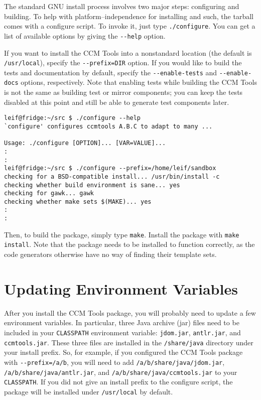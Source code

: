 The standard GNU install process involves two major steps: configuring and
building. To help with platform--independence for installing and such, the
tarball comes with a configure script. To invoke it, just type
\verb+./configure+. You can get a list of available options by giving the
\verb+--help+ option.

If you want to install the CCM Tools into a nonstandard location (the default is
\verb+/usr/local+), specify the \verb+--prefix=DIR+ option. If you would like to
build the tests and documentation by default, specify the \verb+--enable-tests+
and \verb+--enable-docs+ options, respectively. Note that enabling tests while
building the CCM Tools is not the same as building test or mirror components;
you can keep the tests disabled at this point and still be able to generate test
components later.

\begin{verbatim}
leif@fridge:~/src $ ./configure --help
`configure' configures ccmtools A.B.C to adapt to many ...

Usage: ./configure [OPTION]... [VAR=VALUE]...
:
:
leif@fridge:~/src $ ./configure --prefix=/home/leif/sandbox
checking for a BSD-compatible install... /usr/bin/install -c
checking whether build environment is sane... yes
checking for gawk... gawk
checking whether make sets $(MAKE)... yes
:
:
\end{verbatim}

Then, to build the package, simply type \verb+make+. Install the package with
\verb+make install+. Note that the package needs to be installed to function
correctly, as the code generators otherwise have no way of finding their
template sets.

\section{Updating Environment Variables}

After you install the CCM Tools package, you will probably need to update a few
environment variables. In particular, three Java archive (jar) files need to be
included in your \verb+CLASSPATH+ environment variable: \verb+jdom.jar+,
\verb+antlr.jar+, and \verb+ccmtools.jar+. These three files are installed in
the \verb+/share/java+ directory under your install prefix. So, for example, if
you configured the CCM Tools package with \verb+--prefix=/a/b+, you will need to
add \verb+/a/b/share/java/jdom.jar+, \verb+/a/b/share/java/antlr.jar+, and
\verb+/a/b/share/java/ccmtools.jar+ to your \verb+CLASSPATH+. If you did not
give an install prefix to the configure script, the package will be installed
under \verb+/usr/local+ by default.
